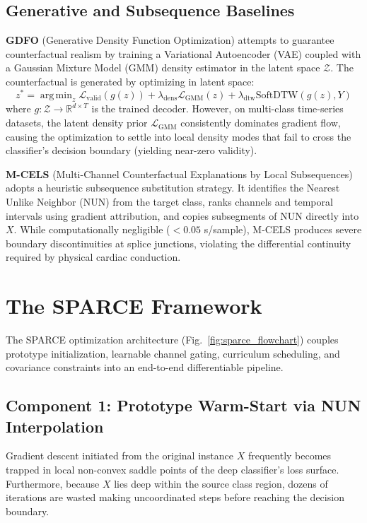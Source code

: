 \documentclass[conference]{IEEEtran}
\newcommand{\R}{\mathbb{R}}
\DeclareMathOperator*{\argmin}{arg\,min}
\begin{document}
\subsection{Generative and Subsequence Baselines}
\textbf{GDFO} (Generative Density Function Optimization) \cite{crabb2024gdfo} attempts to guarantee counterfactual realism by training a Variational Autoencoder (VAE) coupled with a Gaussian Mixture Model (GMM) density estimator in the latent space $\mathcal{Z}$. The counterfactual is generated by optimizing in latent space:
\begin{equation}
    z^* = \argmin_z \mathcal{L}_{\text{valid}}(g(z)) + \lambda_{\text{dens}} \mathcal{L}_{\text{GMM}}(z) + \lambda_{\text{dtw}} \text{SoftDTW}(g(z), Y)
\end{equation}
where $g: \mathcal{Z} \to \R^{d \times T}$ is the trained decoder. However, on multi-class time-series datasets, the latent density prior $\mathcal{L}_{\text{GMM}}$ consistently dominates gradient flow, causing the optimization to settle into local density modes that fail to cross the classifier's decision boundary (yielding near-zero validity).

\textbf{M-CELS} (Multi-Channel Counterfactual Explanations by Local Subsequences) \cite{ates2021counterfactual} adopts a heuristic subsequence substitution strategy. It identifies the Nearest Unlike Neighbor ($\text{NUN}$) from the target class, ranks channels and temporal intervals using gradient attribution, and copies subsegments of $\text{NUN}$ directly into $X$. While computationally negligible ($< 0.05$ s/sample), M-CELS produces severe boundary discontinuities at splice junctions, violating the differential continuity required by physical cardiac conduction.

\section{The SPARCE Framework}
The SPARCE optimization architecture (Fig.~\ref{fig:sparce_flowchart}) couples prototype initialization, learnable channel gating, curriculum scheduling, and covariance constraints into an end-to-end differentiable pipeline.

\subsection{Component 1: Prototype Warm-Start via NUN Interpolation}
Gradient descent initiated from the original instance $X$ frequently becomes trapped in local non-convex saddle points of the deep classifier's loss surface. Furthermore, because $X$ lies deep within the source class region, dozens of iterations are wasted making uncoordinated steps before reaching the decision boundary.
\end{document}
